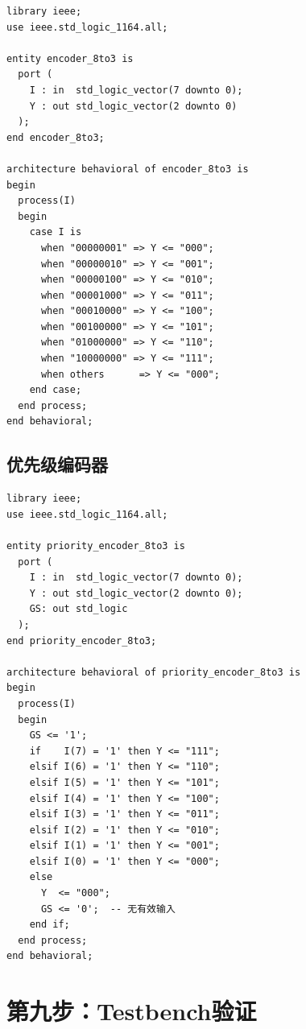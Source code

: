 \begin{lstlisting}[caption={8-3编码器VHDL实现（if-else版本）}]
library ieee;
use ieee.std_logic_1164.all;

entity encoder_8to3 is
  port (
    I : in  std_logic_vector(7 downto 0);
    Y : out std_logic_vector(2 downto 0)
  );
end encoder_8to3;

architecture behavioral of encoder_8to3 is
begin
  process(I)
  begin
    case I is
      when "00000001" => Y <= "000";
      when "00000010" => Y <= "001";
      when "00000100" => Y <= "010";
      when "00001000" => Y <= "011";
      when "00010000" => Y <= "100";
      when "00100000" => Y <= "101";
      when "01000000" => Y <= "110";
      when "10000000" => Y <= "111";
      when others      => Y <= "000";
    end case;
  end process;
end behavioral;
\end{lstlisting}

\subsection{优先级编码器}

\begin{lstlisting}[caption={8-3优先级编码器（使用if-else级联）}]
library ieee;
use ieee.std_logic_1164.all;

entity priority_encoder_8to3 is
  port (
    I : in  std_logic_vector(7 downto 0);
    Y : out std_logic_vector(2 downto 0);
    GS: out std_logic
  );
end priority_encoder_8to3;

architecture behavioral of priority_encoder_8to3 is
begin
  process(I)
  begin
    GS <= '1';
    if    I(7) = '1' then Y <= "111";
    elsif I(6) = '1' then Y <= "110";
    elsif I(5) = '1' then Y <= "101";
    elsif I(4) = '1' then Y <= "100";
    elsif I(3) = '1' then Y <= "011";
    elsif I(2) = '1' then Y <= "010";
    elsif I(1) = '1' then Y <= "001";
    elsif I(0) = '1' then Y <= "000";
    else
      Y  <= "000";
      GS <= '0';  -- 无有效输入
    end if;
  end process;
end behavioral;
\end{lstlisting}

\section{第九步：Testbench验证}

